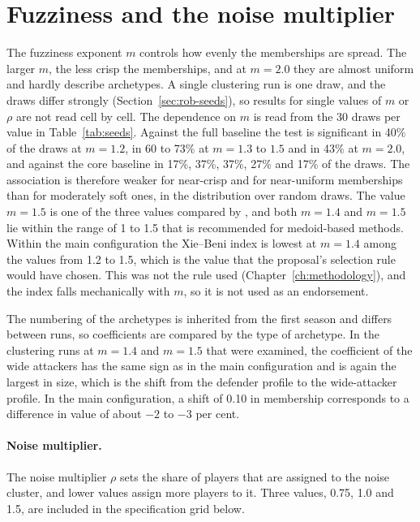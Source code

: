 \section{Fuzziness and the noise multiplier}
\label{sec:rob-fuzziness}

The fuzziness exponent $m$ controls how evenly the memberships are spread. The larger $m$, the less crisp the memberships, and at $m=2.0$ they are almost uniform and hardly describe archetypes. A single clustering run is one draw, and the draws differ strongly (Section~\ref{sec:rob-seeds}), so results for single values of $m$ or $\rho$ are not read cell by cell. The dependence on $m$ is read from the 30 draws per value in Table~\ref{tab:seeds}. Against the full baseline the test is significant in 40\% of the draws at $m=1.2$, in 60 to 73\% at $m=1.3$ to $1.5$ and in 43\% at $m=2.0$, and against the core baseline in 17\%, 37\%, 37\%, 27\% and 17\% of the draws. The association is therefore weaker for near-crisp and for near-uniform memberships than for moderately soft ones, in the distribution over random draws. The value $m=1.5$ is one of the three values compared by , and both $m=1.4$ and $m=1.5$ lie within the range of 1 to 1.5 that is recommended for medoid-based methods. Within the main configuration the Xie--Beni index is lowest at $m=1.4$ among the values from 1.2 to 1.5, which is the value that the proposal's selection rule would have chosen. This was not the rule used (Chapter~\ref{ch:methodology}), and the index falls mechanically with $m$, so it is not used as an endorsement.

The numbering of the archetypes is inherited from the first season and differs between runs, so coefficients are compared by the type of archetype. In the clustering runs at $m=1.4$ and $m=1.5$ that were examined, the coefficient of the wide attackers has the same sign as in the main configuration and is again the largest in size, which is the shift from the defender profile to the wide-attacker profile. In the main configuration, a shift of 0.10 in membership corresponds to a difference in value of about $-2$ to $-3$ per cent.

\paragraph{Noise multiplier.} The noise multiplier $\rho$ sets the share of players that are assigned to the noise cluster, and lower values assign more players to it. Three values, 0.75, 1.0 and 1.5, are included in the specification grid below.

